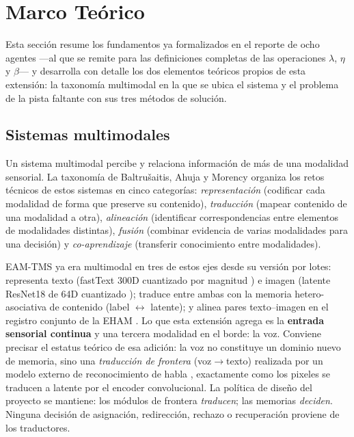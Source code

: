 \section{Marco Teórico}
\label{sec:marco_teorico}

Esta sección resume los fundamentos ya formalizados en el reporte de ocho agentes
---al que se remite para las definiciones completas de las operaciones $\lambda$,
$\eta$ y $\beta$--- y desarrolla con detalle los dos elementos teóricos propios de
esta extensión: la taxonomía multimodal en la que se ubica el sistema y el problema de
la pista faltante con sus tres métodos de solución.

\subsection{Sistemas multimodales}
\label{sec:multimodal}

Un sistema multimodal percibe y relaciona información de más de una modalidad
sensorial.
La taxonomía de Baltru\v{s}aitis, Ahuja y Morency \cite{baltrusaitis2019multimodal}
organiza los retos técnicos de estos sistemas en cinco categorías:
\emph{representación} (codificar cada modalidad de forma que preserve su contenido),
\emph{traducción} (mapear contenido de una modalidad a otra),
\emph{alineación} (identificar correspondencias entre elementos de modalidades
distintas),
\emph{fusión} (combinar evidencia de varias modalidades para una decisión) y
\emph{co-aprendizaje} (transferir conocimiento entre modalidades).

EAM-TMS ya era multimodal en tres de estos ejes desde su versión por lotes:
representa texto (fastText 300D cuantizado por magnitud
\cite{bojanowski2017fasttext}) e imagen (latente ResNet18 de 64D cuantizado
\cite{he2016resnet}); traduce entre ambas con la memoria hetero-asociativa de
contenido (label $\leftrightarrow$ latente); y alinea pares texto--imagen en el
registro conjunto de la EHAM \cite{morales2024hetero}.
Lo que esta extensión agrega es la \textbf{entrada sensorial continua} y una tercera
modalidad en el borde: la voz.
Conviene precisar el estatus teórico de esa adición: la voz no constituye un dominio
nuevo de memoria, sino una \emph{traducción de frontera} (voz$\to$texto) realizada por
un modelo externo de reconocimiento de habla \cite{radford2023whisper}, exactamente
como los pixeles se traducen a latente por el encoder convolucional.
La política de diseño del proyecto se mantiene: los módulos de frontera
\emph{traducen}; las memorias \emph{deciden}.
Ninguna decisión de asignación, redirección, rechazo o recuperación proviene de los
traductores.

